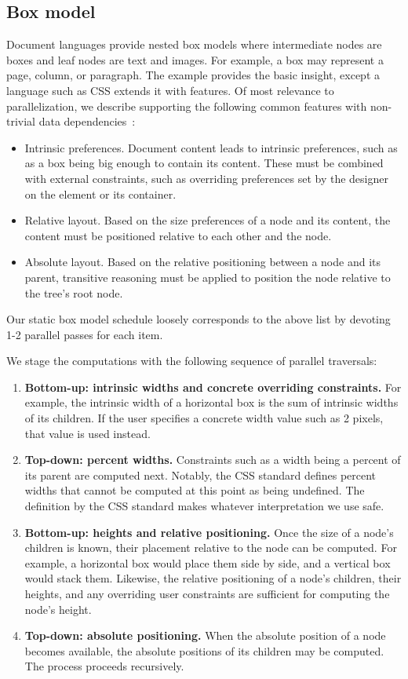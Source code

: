 \subsection{Box model}
Document languages provide nested box models where intermediate nodes are boxes and leaf nodes are text and images. For example, a box may represent a page, column, or paragraph. The \hlang{} example provides the basic insight, except a language such as CSS extends it with features. Of most relevance to parallelization, we describe supporting the following common features with non-trivial data dependencies~\cite{mama}:
\begin{itemize}
\item Intrinsic preferences. Document content leads to intrinsic preferences, such as as a box being big enough to contain its content. These must be combined with external constraints, such as overriding preferences set by the designer on the element or its container. 
\item Relative layout. Based on the size preferences of a node and its content, the content must be positioned relative to each other and the node.
\item Absolute layout. Based on the relative positioning between a node and its parent, transitive reasoning must be applied to position the node relative to the tree's root node.
\end{itemize}
Our static box model schedule loosely corresponds to the above list by devoting 1-2 parallel passes for each item. 

We stage the computations with the following sequence of parallel traversals:
\begin{enumerate}
\item \textbf{Bottom-up: intrinsic widths and concrete overriding constraints.} For example, the intrinsic width of a horizontal box is the sum of intrinsic widths of its children. If the user specifies a concrete width value such as 2 pixels, that value is used instead.
\item \textbf{Top-down: percent widths.}  Constraints such as a width being a percent of its parent are computed next. Notably, the CSS standard defines percent widths that cannot be computed at this point as being undefined. The definition by the CSS standard makes whatever interpretation we use safe.
\item \textbf{Bottom-up: heights and relative positioning.} Once the size of a node's children is known, their placement relative to the node can be computed. For example, a horizontal box would place them side by side, and a vertical box would stack them. Likewise, the relative positioning of a node's children, their heights, and any overriding user constraints are sufficient for computing the node's height.
\item \textbf{Top-down: absolute positioning.} When the absolute position of a node becomes available, the absolute positions of its children may be computed. The process proceeds recursively.
\end{enumerate}


